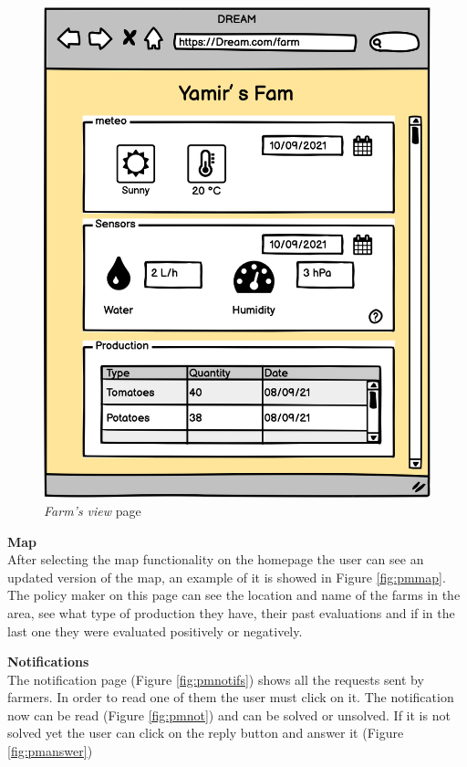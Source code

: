 \begin{figure}[H]
\begin{minipage}{0.39\textwidth}
        \includegraphics[width=1\textwidth]{images/mockups/PMFarm.png}
        \caption{\emph{Farm's view} page}
        \label{fig:pmfarm}
    \end{minipage}
\end{figure}

\textbf{Map} \\
After selecting the map functionality on the homepage the user can see an updated version of the map, 
an example of it is showed in Figure \ref{fig:pmmap}.
The policy maker on this page can see the location and name of the farms in the area, see what type of production 
they have, their past evaluations and if in the last one they were evaluated positively or negatively.

\textbf{Notifications} \\
The notification page (Figure \ref{fig:pmnotifs}) shows all the requests sent by farmers. In order to read one of them the user must click on it. The notification now can be read (Figure \ref{fig:pmnot}) and can be solved or unsolved. 
If it is not solved yet the user can click on the reply button and answer it (Figure \ref{fig:pmanswer})


